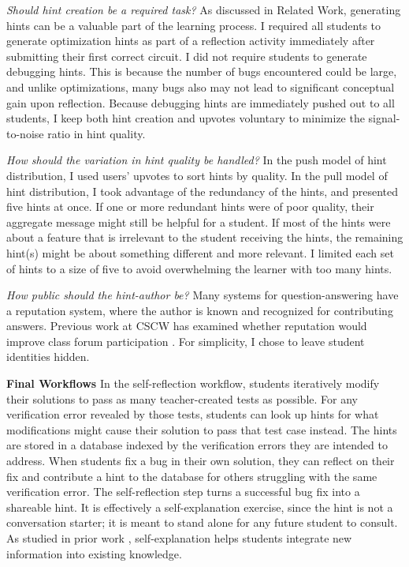 {\it Should hint creation be a required task?} As discussed in Related Work, generating hints can be a valuable part of the learning process. I required all students to generate optimization hints as part of a reflection activity immediately after submitting their first correct circuit. I did not require students to generate debugging hints. This is because the number of bugs encountered could be large, and unlike optimizations, many bugs also may not lead to significant conceptual gain upon reflection. Because debugging hints are immediately pushed out to all students, I keep both hint creation and upvotes voluntary to minimize the signal-to-noise ratio in hint quality.

{\it How should the variation in hint quality be handled?} In the push model of hint distribution, I used users' upvotes to sort hints by quality. In the pull model of hint distribution, I took advantage of the redundancy of the hints, and presented five hints at once. If one or more redundant hints were of poor quality, their aggregate message might still be helpful for a student. If most of the hints were about a feature that is irrelevant to the student receiving the hints, the remaining hint(s) might be about something different and more relevant. I limited each set of hints to a size of five to avoid overwhelming the learner with too many hints.

{\it How public should the hint-author be?} Many systems for question-answering have a reputation system, where the author is known and recognized for contributing answers. Previous work at CSCW has examined whether reputation would improve class forum participation \cite{reputation}. For simplicity, I chose to leave student identities hidden.

{\bf Final Workflows} In the self-reflection workflow, students iteratively modify their solutions to pass as many teacher-created tests as possible. For any verification error revealed by those tests, students can look up hints for what modifications might cause their solution to pass that test case instead. The hints are stored in a database indexed by the verification errors they are intended to address. When students fix a bug in their own solution, they can reflect on their fix and contribute a hint to the database for others struggling with the same verification error. The self-reflection step turns a successful bug fix into a shareable hint. It is effectively a self-explanation exercise, since the hint is not a conversation starter; it is meant to stand alone for any future student to consult. As studied in prior work \cite{selfexplanation}, self-explanation helps students integrate new information into existing knowledge.

